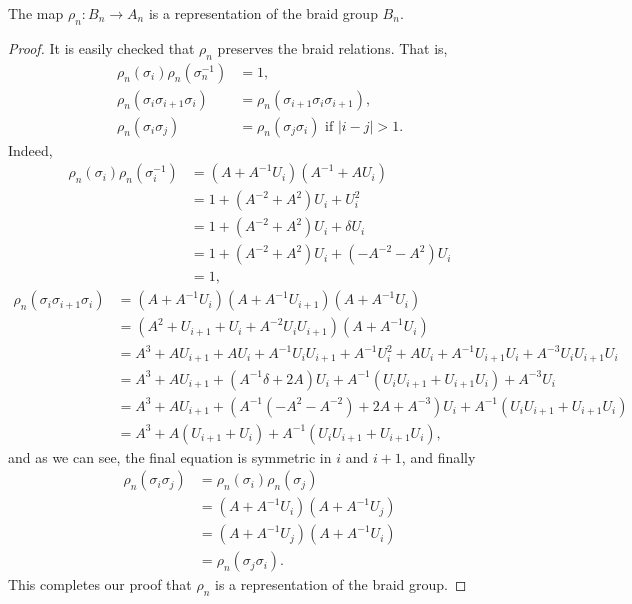 \begin{proposition}
The map $\rho_n: B_n \to A_n$ is a representation of the braid group $B_n$.
\end{proposition}
\begin{proof}
It is easily checked that $\rho_n$ preserves the braid relations. That is, 
\begin{align*}
  \rho_n(\sigma_i)\rho_n(\sigma^{-1}_n) &= 1, \\
  \rho_n(\sigma_i\sigma_{i+1}\sigma_i) &= \rho_n(\sigma_{i+1}\sigma_i\sigma_{i+1}), \\
  \rho_n(\sigma_i\sigma_j) &= \rho_n(\sigma_j\sigma_i) \text{ if } |i-j|>1.
\end{align*}
Indeed, 
\begin{align*}
  \rho_n(\sigma_i)\rho_n(\sigma_i^{-1}) &= (A+A^{-1}U_i)(A^{-1} + AU_i) \\
                                        &= 1 + (A^{-2} + A^2)U_i + U_i^2 \\
                                        &= 1 + (A^{-2} + A^2)U_i + \delta U_i \\
                                        &= 1 + (A^{-2} + A^2)U_i + (-A^{-2} - A^2)U_i \\
  &= 1,
\end{align*}
\begin{align*}
  \rho_n(\sigma_i\sigma_{i+1}\sigma_i) &= (A+A^{-1}U_i)(A + A^{-1}U_{i+1})(A + A^{-1}U_i) \\
                                       &= (A^2 + U_{i+1} + U_i + A^{-2}U_iU_{i+1})(A + A^{-1}U_i) \\
                                       &= A^3 + AU_{i+1} + AU_i + A^{-1}U_iU_{i+1} + A^{-1}U_i^2 + AU_i + A^{-1}U_{i+1}U_i + A^{-3}U_iU_{i+1}U_i \\
                                       &= A^3 + AU_{i+1} + (A^{-1}\delta + 2A)U_i + A^{-1}(U_iU_{i+1} + U_{i+1}U_i) + A^{-3}U_i \\
                                       &= A^3 + AU_{i+1} + (A^{-1}(-A^2 - A^{-2}) + 2A + A^{-3})U_i + A^{-1}(U_iU_{i+1} + U_{i+1}U_i) \\
  &= A^3 + A(U_{i+1} + U_i) + A^{-1}(U_iU_{i+1} + U_{i+1}U_i),
\end{align*}
and as we can see, the final equation is symmetric in $i$ and $i+1$, and finally 
\begin{align*}
  \rho_n(\sigma_i\sigma_j) &= \rho_n(\sigma_i)\rho_n(\sigma_{j}) \\
                           &= (A+A^{-1}U_i)(A + A^{-1}U_j) \\
                           &= (A + A^{-1}U_j)(A + A^{-1}U_i) \\
  &= \rho_n(\sigma_j\sigma_i).
\end{align*}
This completes our proof that $\rho_n$ is a representation of the braid group.
\end{proof}

